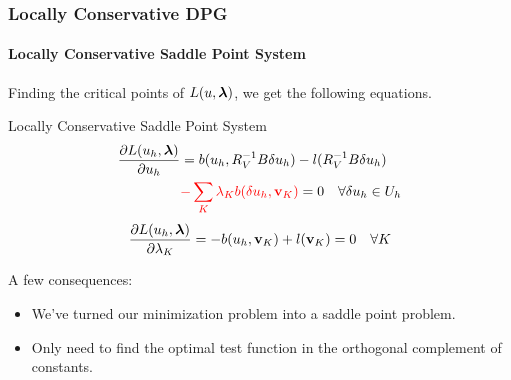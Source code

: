 \documentclass[18pt,xcolor=table]{beamer}
\begin{document}
\begin{frame}
\frametitle{Locally Conservative DPG}
\framesubtitle{Locally Conservative Saddle Point System}
Finding the critical points of $L(u,\boldsymbol\lambda)$, we get the following
equations.
\begin{block}{Locally Conservative Saddle Point System}
\begin{align*}
\frac{\partial L(u_h,\boldsymbol\lambda)}{\partial u_h}&=b(u_h,R_V^{-1}B\delta u_h)
-l(R_V^{-1}B\delta u_h)\\
&{\color{red}-\sum_K\lambda_K b(\delta
u_h,\mathbf{v}_K)}=0\quad\forall\delta u_h\in U_h
\end{align*}
\[
\frac{\partial
L(u_h,\boldsymbol\lambda)}{\partial\lambda_K}=-b(u_h,\mathbf{v}_K)+l(\mathbf{v}_K)=0\quad\forall
K
\]
\end{block}
A few consequences:
\begin{itemize}
\item We've turned our minimization problem into a saddle point problem.
\item Only need to find the optimal test function in the orthogonal complement
of constants. %
\end{itemize}
\end{frame}
\end{document}
